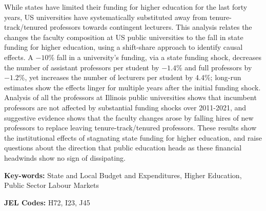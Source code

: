 While states have limited their funding for higher education for the last forty years, US universities have systematically substituted away from tenure-track/tenured professors towards contingent lecturers.
This analysis relates the changes the faculty composition at US public universities to the fall in state funding for higher education, using a shift-share approach to identify causal effects.
A $-10$\% fall in a university's funding, via a state funding shock, decreases the number of assistant professors per student by $-1.4$\% and full professors by $-1.2$\%, yet increases the number of lecturers per student by 4.4\%; long-run estimates show the effects linger for multiple years after the initial funding shock.
Analysis of all the professors at Illinois public universities shows that incumbent professors are not affected by substantial funding shocks over 2011-2021, and suggestive evidence shows that the faculty changes arose by falling hires of new professors to replace leaving tenure-track/tenured professors.
These results show the institutional effects of stagnating state funding for higher education, and raise questions about the direction that public education heads as these financial headwinds show no sign of dissipating.

\vfill
\noindent
\textbf{Key-words:}
State and Local Budget and Expenditures,
Higher Education,
Public Sector Labour Markets

\vspace{0.1cm}
\noindent
\textbf{JEL Codes:} H72, I23, J45
